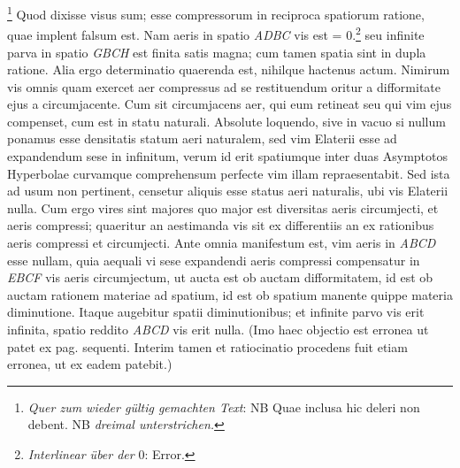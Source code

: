 \footnote{\textit{Quer zum wieder g\"{u}ltig gemachten Text}: NB Quae inclusa hic deleri non debent. NB \textit{dreimal unterstrichen.}}
\pend 
\pstart \footnotesize Quod dixisse visus sum; esse  compressorum in reciproca spatiorum ratione, quae implent falsum est. Nam aeris in spatio \textit{ADBC} vis est = 0.\footnote{\textit{Interlinear \"{u}ber der} 0: Error.} seu infinite parva in spatio\protect{} \textit{GBCH} est finita satis magna; cum tamen spatia sint in dupla ratione. Alia ergo determinatio quaerenda est, nihilque hactenus actum.\pend 
\pstart  \footnotesize Nimirum vis omnis quam exercet aer compressus ad se restituendum oritur a difformitate ejus a circumjacente. Cum sit circumjacens aer, qui eum retineat seu qui vim ejus compenset, cum est in statu naturali\protect{}. Absolute loquendo, sive in vacuo si nullum ponamus esse densitatis statum\protect{} aeri naturalem, sed vim Elaterii\protect{} esse ad expandendum sese in infinitum, verum id erit spatiumque inter duas Asymptotos Hyperbolae curvamque comprehensum perfecte vim illam repraesentabit. Sed ista ad usum non pertinent,  censetur aliquis esse status\protect{} aeri naturalis, ubi vis Elaterii\protect{} nulla. Cum ergo vires sint majores quo major est diversitas aeris circumjecti, et aeris compressi; quaeritur an aestimanda vis sit ex differentiis an ex rationibus aeris compressi et circumjecti. Ante omnia manifestum est, vim aeris in \textit{ABCD} esse nullam, quia aequali vi sese expandendi aeris compressi compensatur in \textit{EBCF} vis aeris  circumjectum, ut aucta est ob auctam difformitatem, id est ob auctam rationem materiae ad spatium, id est ob spatium manente quippe materia diminutione. Itaque  augebitur spatii diminutionibus; et  infinite parvo vis erit infinita, spatio reddito \textit{ABCD} vis erit nulla. (Imo haec objectio est erronea ut patet ex pag. sequenti. Interim tamen et ratiocinatio procedens fuit etiam erronea, ut ex eadem patebit.)\pend